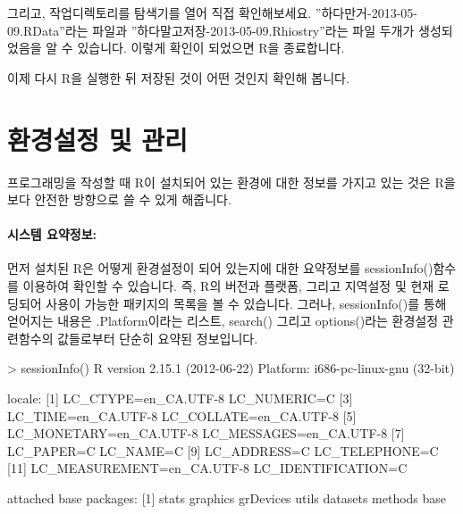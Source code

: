 그리고, 작업디렉토리를 탐색기를 열어 직접 확인해보세요. 
''하다만거-2013-05-09.RData''라는 파일과 ''하다말고저장-2013-05-09.Rhiostry''라는 파일 두개가 생성되었음을 알 수 있습니다.
이렇게 확인이 되었으면 R을 종료합니다.

이제 다시 R을 실행한 뒤 저장된 것이 어떤 것인지 확인해 봅니다. 

\begin{Schunk}
\end{Schunk}

\section{환경설정 및 관리}

프로그래밍을 작성할 때 R이 설치되어 있는 환경에 대한 정보를 가지고 있는 것은 R을 보다 안전한 방향으로 쓸 수 있게 해줍니다.

\paragraph{시스템 요약정보:} 먼저 설치된 R은 어떻게 환경설정이 되어 있는지에 대한 요약정보를 sessionInfo()함수를 이용하여 확인할 수 있습니다.
즉, R의 버전과 플랫폼, 그리고 지역설정 및 현재 로딩되어 사용이 가능한 패키지의 목록을 볼 수 있습니다. 
그러나, sessionInfo()를 통해 얻어지는 내용은 .Platform이라는 리스트, search() 그리고 options()라는 환경설정 관련함수의 값들로부터 단순히 요약된 정보입니다. 

\begin{Schunk}
\begin{Soutput}
> sessionInfo()
R version 2.15.1 (2012-06-22)
Platform: i686-pc-linux-gnu (32-bit)

locale:
 [1] LC_CTYPE=en_CA.UTF-8       LC_NUMERIC=C              
 [3] LC_TIME=en_CA.UTF-8        LC_COLLATE=en_CA.UTF-8    
 [5] LC_MONETARY=en_CA.UTF-8    LC_MESSAGES=en_CA.UTF-8   
 [7] LC_PAPER=C                 LC_NAME=C                 
 [9] LC_ADDRESS=C               LC_TELEPHONE=C            
[11] LC_MEASUREMENT=en_CA.UTF-8 LC_IDENTIFICATION=C       

attached base packages:
[1] stats     graphics  grDevices utils     datasets  methods   base     
\end{Soutput}
\end{Schunk}

